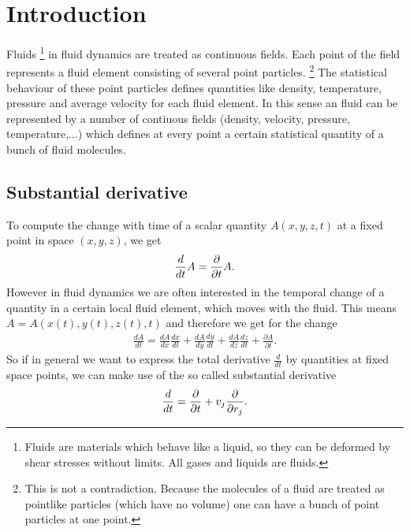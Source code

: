 \section{Introduction}
Fluids
\footnote{Fluids are materials which behave like a liquid, so they can be
deformed by shear stresses without limits. All gases and liquids are fluids.}
 in fluid dynamics are treated as continuous fields. Each point of the
field represents a fluid element consisting of several point particles.
\footnote{This is not a contradiction. Because the molecules of a fluid
are treated as pointlike particles (which have no volume) one can have a bunch
of point particles at one point.}
The statistical behaviour of these point particles 
defines quantities like density, temperature, pressure and average velocity
for each fluid element. In this sense an fluid can be represented by a number of
contiuous fields (density, velocity, pressure, temperature,...)
which defines at every point a certain statistical quantity of a bunch 
of fluid molecules.

\subsection{Substantial derivative}
To compute the change with time of a scalar quantity $A(x,y,z,t)$ at a fixed
point in
space $(x,y,z)$, we get
 \begin{align}
\frac{d}{d t} A=\frac{\partial}{\partial t} A.
\end{align}
However in fluid dynamics we are often interested in the temporal change of a
quantity in a certain local fluid element, which moves with the fluid. This
means
$A=A(x(t),y(t),z(t),t)$ and therefore we get for the change
\begin{align}
\frac{dA}{dt}=\frac{dA}{dx}\frac{dx}{dt}+\frac{dA}{dy}\frac{dy}{dt}+
\frac{dA}{dz}\frac{dz}{dt}+\frac{\partial A}{\partial t}.
\end{align}
So if in general we want to express the total derivative $\frac{d}{dt}$ by
quantities at fixed space points, we can make use of the so called substantial
derivative
\begin{align}
\frac{d}{d t}=\frac{\partial}{\partial t} + v_j \frac{\partial}{\partial r_j}. \label{eq:1}
\end{align}
